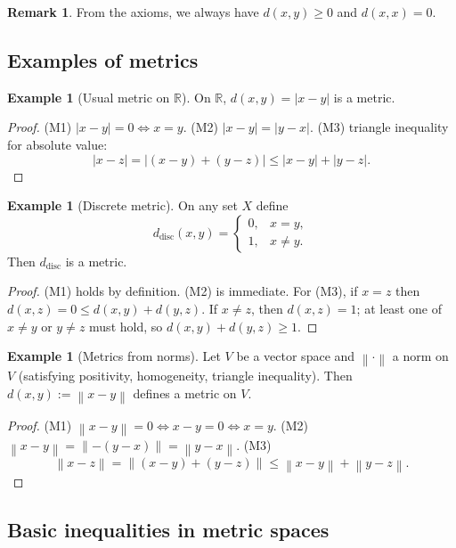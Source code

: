 \documentclass[11pt]{article}
\theoremstyle{definition}
\newtheorem{example}[theorem]{Example}
\newtheorem{remark}[theorem]{Remark}
\newcommand{\R}{\mathbb{R}}
\newcommand{\norm}[1]{\left\lVert #1\right\rVert}
\begin{document}
\begin{remark}
From the axioms, we always have $d(x,y)\ge 0$ and $d(x,x)=0$.
\end{remark}

\subsection{Examples of metrics}

\begin{example}[Usual metric on $\R$]
On $\R$, $d(x,y)=|x-y|$ is a metric.
\end{example}

\begin{proof}
(M1) $|x-y|=0\iff x=y$. (M2) $|x-y|=|y-x|$. (M3) triangle inequality for absolute value:
\[
|x-z|=|(x-y)+(y-z)|\le |x-y|+|y-z|.
\]
\end{proof}

\begin{example}[Discrete metric]
On any set $X$ define
\[
d_{\mathrm{disc}}(x,y)=
\begin{cases}
0, & x=y,\\
1, & x\ne y.
\end{cases}
\]
Then $d_{\mathrm{disc}}$ is a metric.
\end{example}

\begin{proof}
(M1) holds by definition. (M2) is immediate. For (M3), if $x=z$ then $d(x,z)=0\le d(x,y)+d(y,z)$.
If $x\ne z$, then $d(x,z)=1$; at least one of $x\ne y$ or $y\ne z$ must hold, so $d(x,y)+d(y,z)\ge 1$.
\end{proof}

\begin{example}[Metrics from norms]
Let $V$ be a vector space and $\norm{\cdot}$ a norm on $V$ (satisfying positivity, homogeneity, triangle inequality).
Then $d(x,y):=\norm{x-y}$ defines a metric on $V$.
\end{example}

\begin{proof}
(M1) $\norm{x-y}=0\iff x-y=0\iff x=y$. (M2) $\norm{x-y}=\norm{-(y-x)}=\norm{y-x}$. (M3)
\[
\norm{x-z}=\norm{(x-y)+(y-z)}\le \norm{x-y}+\norm{y-z}.
\]
\end{proof}

\subsection{Basic inequalities in metric spaces}
\end{document}
